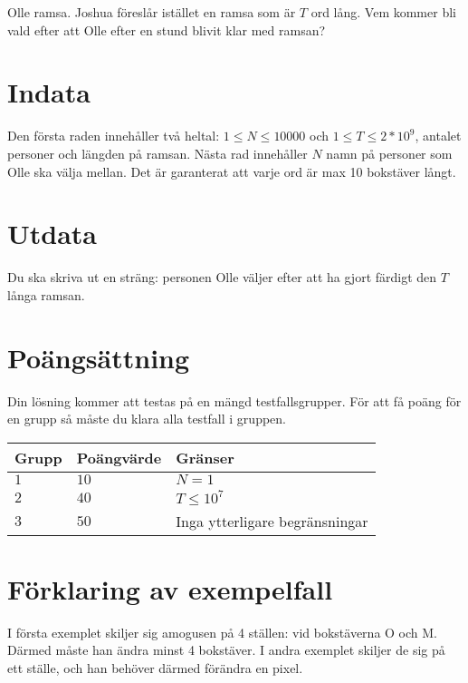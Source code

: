 Olle ramsa. 
Joshua föreslår istället en ramsa som är $T$ ord lång. Vem kommer bli vald efter att Olle efter en stund blivit klar med ramsan?

\section*{Indata}
Den första raden innehåller två heltal: $1 \leq N \leq 10000$ och $1\leq T \leq 2*10^9$, antalet personer och längden på ramsan.
Nästa rad innehåller $N$ namn på personer som Olle ska välja mellan.
Det är garanterat att varje ord är max 10 bokstäver långt.

\section*{Utdata}
Du ska skriva ut en sträng: personen Olle väljer efter att ha gjort färdigt den $T$ långa ramsan.

\section*{Poängsättning}
Din lösning kommer att testas på en mängd testfallsgrupper.
För att få poäng för en grupp så måste du klara alla testfall i gruppen.

\noindent
\begin{tabular}{| l | l | p{12cm} |}
  \hline
  Grupp & Poängvärde & Gränser \\ \hline
  $1$   & $10$       & $N=1$ \\ \hline
  $2$   & $40$       & $T \leq 10^7$ \\ \hline
  $3$   & $50$       & Inga ytterligare begränsningar \\ \hline
\end{tabular}

\section*{Förklaring av exempelfall}
I första exemplet skiljer sig amogusen på 4 ställen: vid bokstäverna O och M. Därmed måste han ändra minst 4 bokstäver.
I andra exemplet skiljer de sig på ett ställe, och han behöver därmed förändra en pixel.